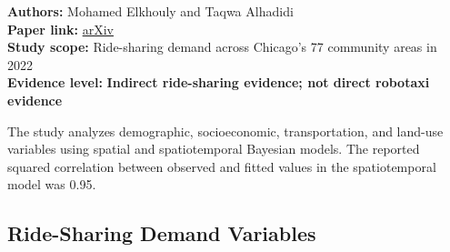 \documentclass[10pt,a4paper]{article}
\begin{document}
\textbf{Authors:} Mohamed Elkhouly and Taqwa Alhadidi\\
\textbf{Paper link:} \href{https://arxiv.org/abs/2406.11590}{arXiv}\\
\textbf{Study scope:} Ride-sharing demand across Chicago's 77 community areas in 2022\\
\textbf{Evidence level:} \textbf{Indirect ride-sharing evidence; not direct robotaxi evidence}

The study analyzes demographic, socioeconomic, transportation, and land-use variables using spatial and spatiotemporal Bayesian models. The reported squared correlation between observed and fitted values in the spatiotemporal model was 0.95.

\hypertarget{ride-sharing-demand-variables}{%
\subsection{Ride-Sharing Demand Variables}\label{ride-sharing-demand-variables}}
\end{document}
